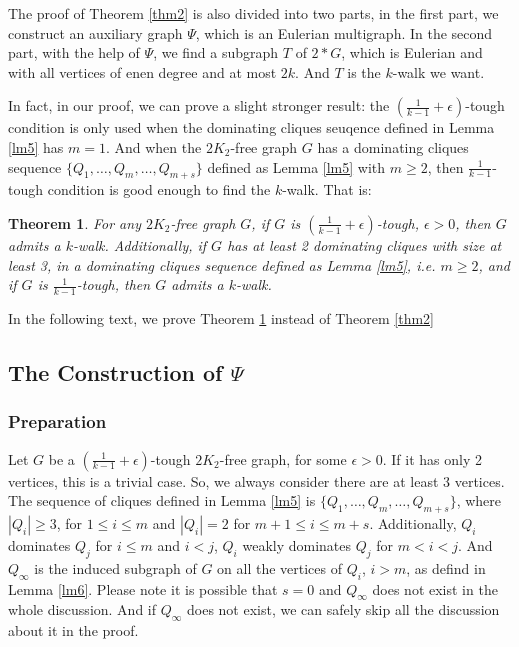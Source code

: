 \documentclass[12pt]{article}
\newtheorem{theorem}{Theorem}
\begin{document}
The proof of Theorem \ref{thm2} is also divided into two parts, in the first part, we construct an auxiliary graph $\Psi$, which is an Eulerian multigraph. In the second part, with the help of $\Psi$, we find a subgraph $T$ of $2*G$, which is Eulerian and with all vertices of enen degree and at most $2k$. And $T$ is the $k$-walk we want.

In fact, in our proof, we can prove a slight stronger result: the $(\frac{1}{k-1}+\epsilon)$-tough condition is only used when the dominating cliques seuqence defined in Lemma \ref{lm5} has $m=1$. And when the $2K_2$-free graph $G$ has a dominating cliques sequence $\{Q_1,\ldots,Q_m,\ldots,Q_{m+s}\}$ defined as Lemma \ref{lm5} with $m\ge2$, then $\frac{1}{k-1}$-tough condition is good enough to find the $k$-walk. That is:
\begin{theorem}\label{opt}
For any $2K_2$-free graph $G$, if $G$ is $(\frac{1}{k-1}+\epsilon)$-tough, $\epsilon>0$, then $G$ admits a $k$-walk. Additionally, if $G$ has at least 2 dominating cliques with size at least 3, in a dominating cliques sequence defined as Lemma \ref{lm5}, i.e. $m\ge2$, and if $G$ is $\frac{1}{k-1}$-tough, then $G$ admits a $k$-walk.
\end{theorem}
In the following text, we prove Theorem \ref{opt} instead of Theorem \ref{thm2}

\subsection{The Construction of $\Psi$}

\subsubsection{Preparation}

Let $G$ be a $(\frac{1}{k-1}+\epsilon)$-tough $2K_2$-free graph, for some $\epsilon>0$. If it has only 2 vertices, this is a trivial case. So, we always consider there are at least 3 vertices. The sequence of cliques defined in Lemma \ref{lm5} is $\{Q_1,\ldots,Q_m,\ldots,Q_{m+s}\}$, where $|Q_i|\ge3$, for $1\le i\le m$ and $|Q_i|=2$ for $m+1\le i\le m+s$. Additionally, $Q_i$ dominates $Q_j$ for $i\le m$ and $i<j$, $Q_i$ weakly dominates $Q_j$ for $m<i<j$. And $Q_{\infty}$ is the induced subgraph of $G$ on all the vertices of $Q_i$, $i>m$, as defind in Lemma \ref{lm6}. Please note it is possible that $s=0$ and $Q_{\infty}$ does not exist in the whole discussion. And if $Q_{\infty}$ does not exist, we can safely skip all the discussion about it in the proof.
\end{document}
